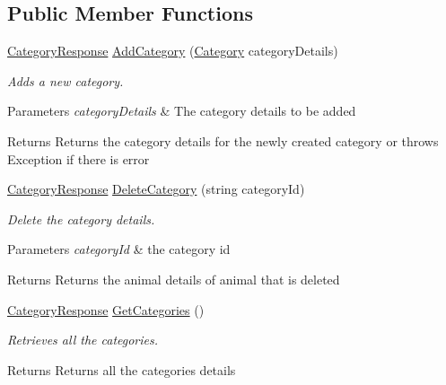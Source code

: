 \subsection*{Public Member Functions}
\begin{DoxyCompactItemize}
\item 
\hyperlink{classWildLifeTracker_1_1Response_1_1CategoryResponse}{Category\+Response} \hyperlink{interfaceWildLifeTracker_1_1ICategoryService_ab22f6cdfb39adc2607dc86cb100889fc}{Add\+Category} (\hyperlink{classWildLifeTracker_1_1Models_1_1Category}{Category} category\+Details)
\begin{DoxyCompactList}\small\item\em Adds a new category. 
\begin{DoxyParams}{Parameters}
{\em category\+Details} & The category details to be added\\
\hline
\end{DoxyParams}
\begin{DoxyReturn}{Returns}
Returns the category details for the newly created category or throws Exception if there is error
\end{DoxyReturn}
\end{DoxyCompactList}\item 
\hyperlink{classWildLifeTracker_1_1Response_1_1CategoryResponse}{Category\+Response} \hyperlink{interfaceWildLifeTracker_1_1ICategoryService_a6479e2a6945b14d40e8c57642e9d2665}{Delete\+Category} (string category\+Id)
\begin{DoxyCompactList}\small\item\em Delete the category details. 
\begin{DoxyParams}{Parameters}
{\em category\+Id} & the category id\\
\hline
\end{DoxyParams}
\begin{DoxyReturn}{Returns}
Returns the animal details of animal that is deleted
\end{DoxyReturn}
\end{DoxyCompactList}\item 
\hyperlink{classWildLifeTracker_1_1Response_1_1CategoryResponse}{Category\+Response} \hyperlink{interfaceWildLifeTracker_1_1ICategoryService_af5ed969c812807a721f06819c9b22356}{Get\+Categories} ()
\begin{DoxyCompactList}\small\item\em Retrieves all the categories. \begin{DoxyReturn}{Returns}
Returns all the categories details

\end{DoxyReturn}
\end{DoxyCompactList}
\end{DoxyCompactItemize}
